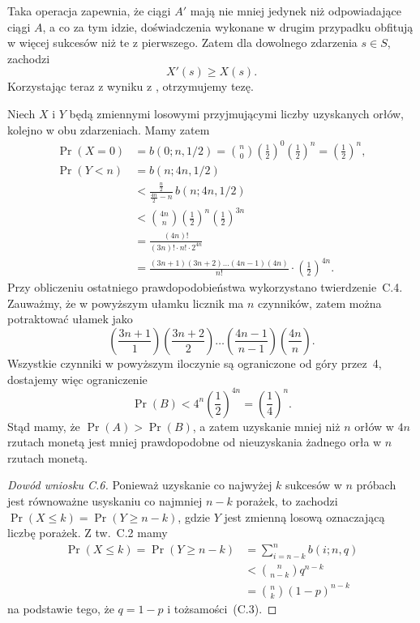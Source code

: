 Taka operacja zapewnia, że ciągi $A'$ mają nie mniej jedynek niż odpowiadające ciągi $A$, a co za tym idzie, doświadczenia wykonane w drugim przypadku obfitują w więcej sukcesów niż te z pierwszego. Zatem dla dowolnego zdarzenia $s\in S$, zachodzi
\[
	X'(s) \ge X(s).
\]
Korzystając teraz z wyniku z , otrzymujemy tezę.


\exercise{} %
Niech $X$ i $Y$ będą zmiennymi losowymi przyjmującymi liczby uzyskanych orłów, kolejno w obu zdarzeniach. Mamy zatem
\begin{align*}
	\Pr(X=0) &= b(0;n,1/2) = \binom{n}{0}\left(\frac{1}{2}\right)^0\left(\frac{1}{2}\right)^n = \left(\frac{1}{2}\right)^n, \\
	\Pr(Y<n) &= b(n;4n,1/2) \\
	&< \frac{\frac{n}{2}}{\frac{4n}{2}-n}\,b(n;4n,1/2) \\
	&< \binom{4n}{n}\left(\frac{1}{2}\right)^n\left(\frac{1}{2}\right)^{3n} \\
	&= \frac{(4n)!}{(3n)!\cdot n!\cdot 2^{4n}} \\
	&= \frac{(3n+1)(3n+2)\dots(4n-1)(4n)}{n!}\cdot\left(\frac{1}{2}\right)^{4n}.
\end{align*}
Przy obliczeniu ostatniego prawdopodobieństwa wykorzystano twierdzenie~C.4. Zauważmy, że w powyższym ułamku licznik ma $n$ czynników, zatem można potraktować ułamek jako
\[
	\left(\frac{3n+1}{1}\right)\left(\frac{3n+2}{2}\right)\dots\left(\frac{4n-1}{n-1}\right)\left(\frac{4n}{n}\right).
\]
Wszystkie czynniki w powyższym iloczynie są ograniczone od góry przez~4, dostajemy więc ograniczenie
\[
	\Pr(B) < 4^n\left(\frac{1}{2}\right)^{4n} = \left(\frac{1}{4}\right)^n.
\]
Stąd mamy, że $\Pr(A)>\Pr(B)$, a zatem uzyskanie mniej niż $n$ orłów w $4n$ rzutach monetą jest mniej prawdopodobne od nieuzyskania żadnego orła w $n$ rzutach monetą.

\exercise{} %
\begin{proof}[Dowód wniosku C.6]
	Ponieważ uzyskanie co najwyżej $k$ sukcesów w $n$ próbach jest równoważne usyskaniu co najmniej $n-k$ porażek, to zachodzi $\Pr(X\le k)=\Pr(Y\ge n-k)$, gdzie $Y$ jest zmienną losową oznaczającą liczbę porażek. Z tw.~C.2 mamy
	\begin{align*}
		\Pr(X\le k) = \Pr(Y\ge n-k) &= \sum_{i=n-k}^nb(i;n,q) \\
		&< \binom{n}{n-k}q^{n-k} \\
		&= \binom{n}{k}(1-p)^{n-k}
	\end{align*}
	na podstawie tego, że $q=1-p$ i tożsamości~(C.3).
\end{proof}

